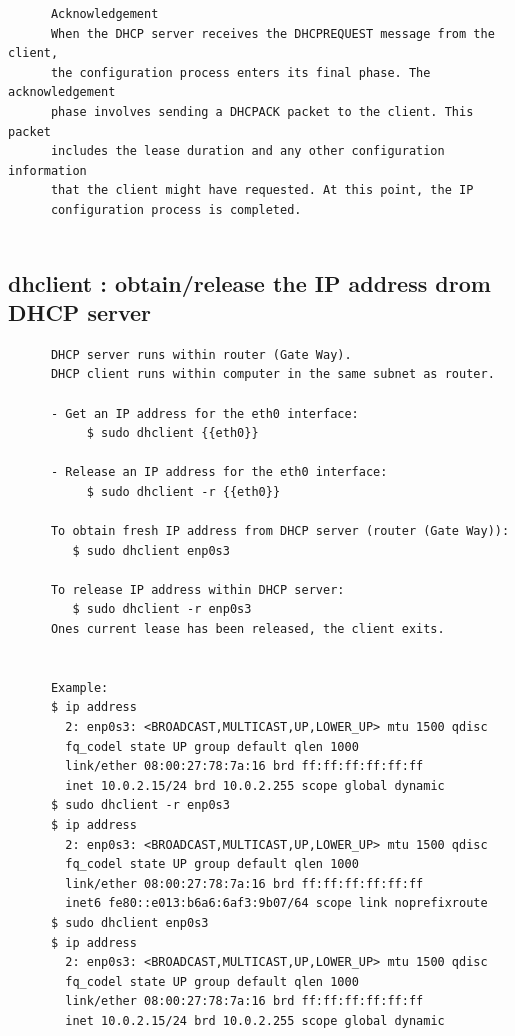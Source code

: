 \documentclass[a4paper,12pt]{article}
\begin{document}
\begin{verbatim}
      Acknowledgement
      When the DHCP server receives the DHCPREQUEST message from the client,       
      the configuration process enters its final phase. The acknowledgement 
      phase involves sending a DHCPACK packet to the client. This packet 
      includes the lease duration and any other configuration information 
      that the client might have requested. At this point, the IP 
      configuration process is completed. 
      
\end{verbatim}

\subsection{dhclient : obtain/release the IP address drom DHCP server}
\begin{verbatim}
      DHCP server runs within router (Gate Way). 
      DHCP client runs within computer in the same subnet as router.
      
      - Get an IP address for the eth0 interface:
           $ sudo dhclient {{eth0}}

      - Release an IP address for the eth0 interface:
           $ sudo dhclient -r {{eth0}}

      To obtain fresh IP address from DHCP server (router (Gate Way)):
         $ sudo dhclient enp0s3

      To release IP address within DHCP server:
         $ sudo dhclient -r enp0s3       
      Ones current lease has been released, the client exits.      
      
      
      Example:
      $ ip address
        2: enp0s3: <BROADCAST,MULTICAST,UP,LOWER_UP> mtu 1500 qdisc 
        fq_codel state UP group default qlen 1000
        link/ether 08:00:27:78:7a:16 brd ff:ff:ff:ff:ff:ff
        inet 10.0.2.15/24 brd 10.0.2.255 scope global dynamic 
      $ sudo dhclient -r enp0s3
      $ ip address
        2: enp0s3: <BROADCAST,MULTICAST,UP,LOWER_UP> mtu 1500 qdisc
        fq_codel state UP group default qlen 1000
        link/ether 08:00:27:78:7a:16 brd ff:ff:ff:ff:ff:ff
        inet6 fe80::e013:b6a6:6af3:9b07/64 scope link noprefixroute 
      $ sudo dhclient enp0s3
      $ ip address
        2: enp0s3: <BROADCAST,MULTICAST,UP,LOWER_UP> mtu 1500 qdisc
        fq_codel state UP group default qlen 1000
        link/ether 08:00:27:78:7a:16 brd ff:ff:ff:ff:ff:ff
        inet 10.0.2.15/24 brd 10.0.2.255 scope global dynamic  


\end{verbatim}
\end{document}
